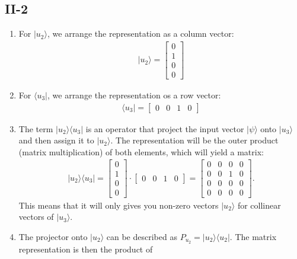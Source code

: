 \documentclass[letterpaper,11pt,twoside]{article}
\newcommand{\ket}[1]{|#1\rangle}
\newcommand{\bra}[1]{\langle#1|}
\begin{document}
  \subsection*{II-2}
  \begin{enumerate}[itemsep=0pt,topsep=0pt,label=(\alph*)]
    \item For $\ket{u_2}$, we arrange the representation as a column vector:
    \begin{align*}
      \ket{u_2}=\begin{bmatrix}
          0\\1\\0\\0
      \end{bmatrix}
    \end{align*}
    \item For $\bra{u_3}$, we arrange the representation os a row vector:
    \begin{align*}
      \bra{u_3}=\begin{bmatrix}
          0&0&1&0
      \end{bmatrix}
    \end{align*}
    \item The term $\ket{u_2}\bra{u_3}$ is an operator that project the input vector $\ket{\psi}$ onto $\ket{u_3}$ and then assign it to $\ket{u_2}$. The representation will be the outer product (matrix multiplication) of both elements, which 
    will yield a matrix:
    \begin{align*}
      \ket{u_2}\bra{u_3}=\begin{bmatrix}
          0\\1\\0\\0
      \end{bmatrix}\cdot\begin{bmatrix}
          0&0&1&0
      \end{bmatrix}=\begin{bmatrix}
        0&0&0&0\\
        0&0&1&0\\
        0&0&0&0\\
        0&0&0&0
      \end{bmatrix}.
    \end{align*} 
    This means that it will only gives you non-zero vectors $\ket{u_2}$ for collinear vectors of $\ket{u_3}$.
    \item The projector onto $\ket{u_2}$ can be described as $P_{u_2}=\ket{u_2}{\bra{u_2}}$. The matrix representation is then the product of 

\end{enumerate}
\end{document}
